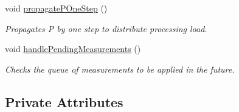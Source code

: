 \begin{DoxyCompactItemize}
void \hyperlink{classmsf__core_1_1MSF__Core_ad0af95ac637bdea27aafd45355ca58cb}{propagate\-P\-One\-Step} ()
\begin{DoxyCompactList}\small\item\em Propagates P by one step to distribute processing load. \end{DoxyCompactList}\item 
void \hyperlink{classmsf__core_1_1MSF__Core_a85803157429d5602e70294378ee49273}{handle\-Pending\-Measurements} ()
\begin{DoxyCompactList}\small\item\em Checks the queue of measurements to be applied in the future. \end{DoxyCompactList}\end{DoxyCompactItemize}
\subsection*{Private Attributes}
